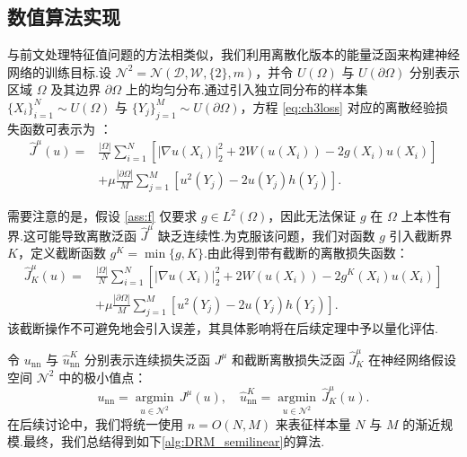 \subsection{数值算法实现}
与前文处理特征值问题的方法相类似，我们利用离散化版本的能量泛函来构建神经网络的训练目标.设 $\mathcal{N}^{2}=\mathcal{N}(\mathcal{D},\mathcal{W},\{2\},m)$，并令 $U(\Omega)$ 与 $U(\partial\Omega)$ 分别表示区域 $\Omega$ 及其边界 $\partial\Omega$ 上的均匀分布.通过引入独立同分布的样本集 $\{X_{i}\}_{i=1}^{N}\sim U(\Omega)$ 与 $\{Y_{j}\}_{j=1}^{M}\sim U(\partial\Omega)$，方程 \eqref{eq:ch3loss} 对应的离散经验损失函数可表示为 \cite{chen2021quasi}：
\begin{equation}\label{eq:disloss0}
\begin{aligned}
\widehat{J}^{\mu}(u) = & \frac{|\Omega|}{N}\sum\limits_{i=1}^{N} \left[ |\nabla u(X_{i})|_{2}^{2}+2W(u(X_{i}))-2g(X_{i})u(X_{i})\right]\\
&+\mu\frac{|\partial\Omega|}{M}\sum\limits_{j=1}^{M}\left[u^{2}(Y_{j})-2u(Y_{j})h(Y_{j})\right].
\end{aligned}
\end{equation}

需要注意的是，假设 \ref{ass:f} 仅要求 $g\in L^2(\Omega)$，因此无法保证 $g$ 在 $\Omega$ 上本性有界.这可能导致离散泛函 $\widehat{J}^{\mu}$ 缺乏连续性.为克服该问题，我们对函数 $g$ 引入截断界 $K$，定义截断函数 $g^K = \min\{g, K\}$.由此得到带有截断的离散损失函数：
\begin{equation}\label{eq:dislossK}
\begin{aligned}
\widehat{J}_{K}^{\mu}(u) = & \frac{|\Omega|}{N}\sum\limits_{i=1}^{N} \left[ |\nabla u(X_{i})|_{2}^{2}+2W(u(X_{i}))-2g^K(X_{i})u(X_{i})\right]\\
&+\mu\frac{|\partial\Omega|}{M}\sum\limits_{j=1}^{M}\left[u^{2}(Y_{j})-2u(Y_{j})h(Y_{j})\right].
\end{aligned}
\end{equation}
该截断操作不可避免地会引入误差，其具体影响将在后续定理中予以量化评估.

令 $u_{\text{nn}}$ 与 $\widehat{u}^{K}_{\text{nn}}$ 分别表示连续损失泛函 $J^{\mu}$ 和截断离散损失泛函 $\widehat{J}_{K}^{\mu}$ 在神经网络假设空间 $\mathcal{N}^{2}$ 中的极小值点：
\begin{equation}\label{eq:u_hat}
u_{\text{nn}}= \underset{u \in \mathcal{N}^{2}}{\operatorname{argmin}}\,J^{\mu}(u),\quad
\widehat{u}^{K}_{\text{nn}}= \underset{u \in \mathcal{N}^{2}}{\operatorname{argmin}}\,\widehat{J}_{K}^{\mu}(u).
\end{equation}
在后续讨论中，我们将统一使用 $n=O(N,M)$ 来表征样本量 $N$ 与 $M$ 的渐近规模.最终，我们总结得到如下\ref{alg:DRM_semilinear}的算法.

